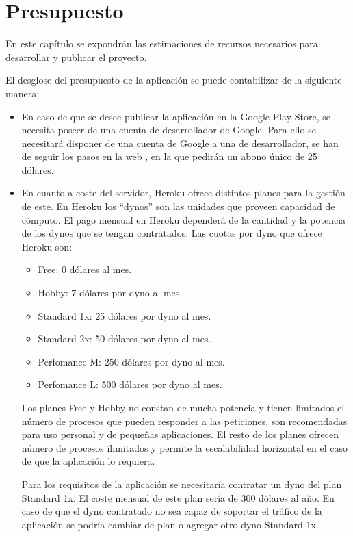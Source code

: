 
\chapter{Presupuesto} \label{chap:RAEntornosUniversitarios} 

En este capítulo se expondrán las estimaciones de recursos necesarios para
desarrollar y publicar el proyecto.

El desglose del presupuesto de la aplicación se puede contabilizar de la siguiente manera:

\begin{itemize}
    \item En caso de que se desee publicar la aplicación en la Google Play Store, se necesita poseer de una cuenta de desarrollador de Google. Para ello se necesitará disponer de una cuenta de Google a una de desarrollador, se han de seguir los pasos en la web \cite{URL::googleplayconsole}, en la que pedirán un abono único de 25 dólares.  
    \item En cuanto a coste del servidor, Heroku ofrece distintos planes para la gestión de este.  En Heroku los ``dynos'' son las unidades que proveen capacidad de cómputo. El pago mensual en Heroku dependerá de la cantidad y la potencia de los dynos que se tengan contratados. Las cuotas por dyno que ofrece Heroku son:
    \begin{itemize}
        \item Free: 0 dólares al mes. 
        \item Hobby: 7 dólares por dyno al mes.
        \item Standard 1x: 25 dólares por dyno al mes.
        \item Standard 2x: 50 dólares por dyno al mes.
        \item Perfomance M: 250 dólares por dyno al mes.
        \item Perfomance L: 500 dólares por dyno al mes.
    \end{itemize}
    
    Los planes Free y Hobby no constan de mucha potencia y tienen limitados el número de procesos que pueden responder a las peticiones, son recomendadas para uso personal y de pequeñas aplicaciones. El resto de los planes ofrecen número de procesos ilimitados y permite la escalabilidad horizontal en el caso de que la aplicación lo requiera.

    Para los requisitos de la aplicación se necesitaría contratar  un dyno del plan Standard 1x. El coste mensual de este plan sería de 300 dólares al año.
    En caso de que el dyno contratado no sea capaz de soportar el tráfico de la aplicación se podría cambiar de plan o agregar otro dyno Standard 1x. 


\end{itemize}
